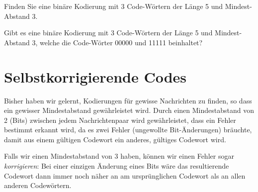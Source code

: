 \begin{mychallenge}\label{challenge:3code}
    Finden Sie eine binäre Kodierung mit 3 Code-Wörtern der Länge 5 und Mindest-Abstand 3.
\end{mychallenge}

\begin{mychallenge}
    Gibt es eine binäre Kodierung mit 3 Code-Wörtern der Länge 5 und Mindest-Abstand 3, welche die Code-Wörter 00000 und 11111 beinhaltet?
\end{mychallenge}



\section{Selbstkorrigierende Codes}

Bisher haben wir gelernt, Kodierungen für gewisse Nachrichten zu finden, so dass ein gewisser Mindestabstand gewährleistet wird. Durch einen Mindestabstand von 2 (Bits) zwischen jedem Nachrichtenpaar wird gewährleistet, dass ein Fehler bestimmt erkannt wird, da es zwei Fehler (ungewollte Bit-Änderungen) bräuchte, damit aus einem gültigen Codewort ein anderes, gültiges Codewort wird.

Falls wir einen Mindestabstand von 3 haben, können wir einen Fehler sogar \textit{korrigieren}: Bei einer einzigen Änderung eines Bits wäre das resultierende Codewort dann immer noch näher an am ursprünglichen Codewort als an allen anderen Codewörtern.


